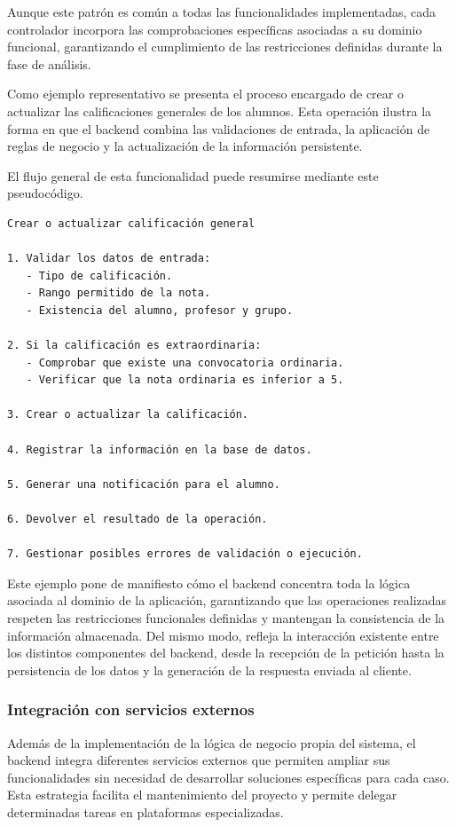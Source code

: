 Aunque este patrón es común a todas las funcionalidades implementadas, cada controlador incorpora las comprobaciones específicas asociadas a su dominio funcional, garantizando el cumplimiento de las restricciones definidas durante la fase de análisis.

Como ejemplo representativo se presenta el proceso encargado de crear o actualizar las calificaciones generales de los alumnos. Esta operación ilustra la forma en que el backend combina las validaciones de entrada, la aplicación de reglas de negocio y la actualización de la información persistente.

El flujo general de esta funcionalidad puede resumirse mediante este pseudocódigo.

\begin{Verbatim}[frame=single, fontsize=\small]
Crear o actualizar calificación general

1. Validar los datos de entrada:
   - Tipo de calificación.
   - Rango permitido de la nota.
   - Existencia del alumno, profesor y grupo.

2. Si la calificación es extraordinaria:
   - Comprobar que existe una convocatoria ordinaria.
   - Verificar que la nota ordinaria es inferior a 5.

3. Crear o actualizar la calificación.

4. Registrar la información en la base de datos.

5. Generar una notificación para el alumno.

6. Devolver el resultado de la operación.

7. Gestionar posibles errores de validación o ejecución.
\end{Verbatim}

Este ejemplo pone de manifiesto cómo el backend concentra toda la lógica asociada al dominio de la aplicación, garantizando que las operaciones realizadas respeten las restricciones funcionales definidas y mantengan la consistencia de la información almacenada. Del mismo modo, refleja la interacción existente entre los distintos componentes del backend, desde la recepción de la petición hasta la persistencia de los datos y la generación de la respuesta enviada al cliente.
\subsubsection{Integración con servicios externos}

Además de la implementación de la lógica de negocio propia del sistema, el backend integra diferentes servicios externos que permiten ampliar sus funcionalidades sin necesidad de desarrollar soluciones específicas para cada caso. Esta estrategia facilita el mantenimiento del proyecto y permite delegar determinadas tareas en plataformas especializadas.

